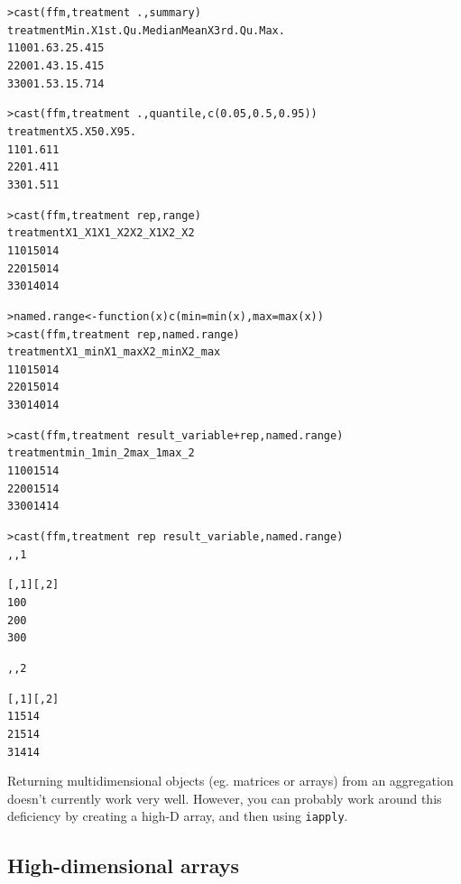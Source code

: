 \documentclass[oneside,letterpaper]{scrartcl}
\begin{document}
\begin{alltt}
> cast(ffm, treatment ~ ., summary)
  treatment Min. X1st.Qu. Median Mean X3rd.Qu. Max.
1         1    0        0    1.6  3.2      5.4   15
2         2    0        0    1.4  3.1      5.4   15
3         3    0        0    1.5  3.1      5.7   14

> cast(ffm, treatment ~ ., quantile, c(0.05, 0.5, 0.95))
  treatment X5. X50. X95.
1         1   0  1.6   11
2         2   0  1.4   11
3         3   0  1.5   11

> cast(ffm, treatment ~ rep, range)
  treatment X1_X1 X1_X2 X2_X1 X2_X2
1         1     0    15     0    14
2         2     0    15     0    14
3         3     0    14     0    14

> named.range <- function(x) c(min = min(x), max = max(x))
> cast(ffm, treatment ~ rep, named.range)
  treatment X1_min X1_max X2_min X2_max
1         1      0     15      0     14
2         2      0     15      0     14
3         3      0     14      0     14

> cast(ffm, treatment ~ result_variable + rep, named.range)
  treatment min_1 min_2 max_1 max_2
1         1     0     0    15    14
2         2     0     0    15    14
3         3     0     0    14    14

> cast(ffm, treatment ~ rep ~ result_variable, named.range)
, , 1

  [,1] [,2]
1    0    0
2    0    0
3    0    0

, , 2

  [,1] [,2]
1   15   14
2   15   14
3   14   14


\end{alltt}

Returning multidimensional objects (eg. matrices or arrays) from an aggregation doesn't currently work very well.  However, you can probably work around this deficiency by creating a high-D array, and then using {\tt iapply}.

\subsection{High-dimensional arrays}\label{sub:high_dimensional_arrays}
\end{document}
